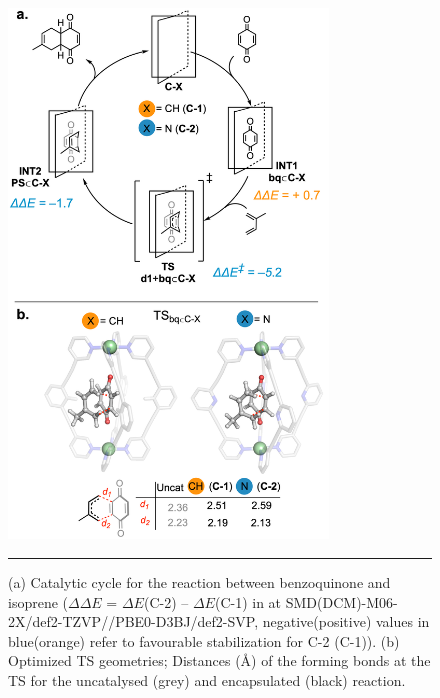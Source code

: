 \documentclass[../../main.tex]{subfiles}
\begin{document}
\begin{figure}[h!]
	\vspace{0.4cm}
	\centering
	\includegraphics[width=8.5cm]{3/da/figs/fig6/fig6}
	\vspace{0.2cm}
	\hrule
	\caption{(a) Catalytic cycle for the reaction between benzoquinone and isoprene ($\Delta\Delta E$ = $\Delta E$(C-2) – $\Delta E$(C-1) in \kcalx at SMD(DCM)-M06-2X/def2-TZVP//PBE0-D3BJ/def2-SVP, negative(positive) values in blue(orange) refer to favourable stabilization for C-2 (C-1)). (b) Optimized TS geometries; Distances (\AA) of the forming bonds at the TS for the uncatalysed (grey) and encapsulated (black) reaction.}
	\label{fig::da_6}
\end{figure}
\end{document}
